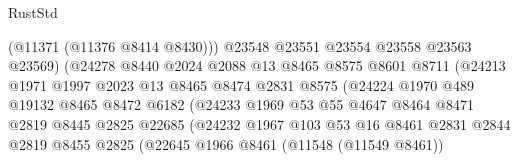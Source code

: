 \begin{lexlean}{RustStd}
\begin{coremodule}
                                    (@11371 (@11376 @8414 @8430)))
                                  @23548
                                  @23551
                                  @23554
                                  @23558
                                  @23563
                                  @23569)
                                (@24278
                                  @8440
                                  @2024
                                  @2088
                                  @13
                                  @8465
                                  @8575
                                  @8601
                                  @8711
                                  (@24213
                                    @1971
                                    @1997
                                    @2023
                                    @13
                                    @8465
                                    @8474
                                    @2831
                                    @8575
                                    (@24224
                                      @1970
                                      @489
                                      @19132
                                      @8465
                                      @8472
                                      @6182
                                      (@24233
                                        @1969
                                        @53
                                        @55
                                        @4647
                                        @8464
                                        @8471
                                        @2819
                                        @8445
                                        @2825
                                        @22685
                                        (@24232
                                          @1967
                                          @103
                                          @53
                                          @16
                                          @8461
                                          @2831
                                          @2844
                                          @2819
                                          @8455
                                          @2825
                                          (@22645
                                            @1966
                                            @8461
                                            (@11548 (@11549 @8461))

\end{coremodule}
\end{lexlean}
